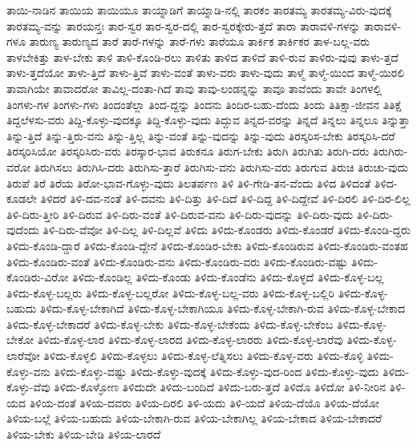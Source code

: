 {ತಾಯಿ-ನಾಡಿನ
ತಾಯಿಯ
ತಾಯಿಯೂ
ತಾಯ್ನಾಡಿಗೆ
ತಾಯ್ನಾಡಿ-ನಲ್ಲಿ
ತಾರಕಂ
ತಾರತಮ್ಯ
ತಾರತಮ್ಯ-ವಿರು-ವುದಕ್ಕೆ
ತಾರತಮ್ಯ-ವನ್ನು
ತಾರಯನ್ತಃ
ತಾರ-ಸ್ವರ
ತಾರ-ಸ್ವರ-ದಲ್ಲಿ
ತಾರ-ಸ್ವರಕ್ಕೇರು-ತ್ತದೆ
ತಾರಾ
ತಾರಾವಳಿ-ಗಳನ್ನು
ತಾರಾವಳಿ-ಗಳೂ
ತಾರುಣ್ಯ
ತಾರುಣ್ಯದ
ತಾರೆ
ತಾರೆ-ಗಳನ್ನು
ತಾರೆ-ಗಳು
ತಾರೆಯೂ
ತಾರ್ಕಿಕ
ತಾರ್ಕಿಕರ
ತಾಳ-ಬಲ್ಲ-ವರು
ತಾಳಬೇಕಿತ್ತು
ತಾಳ-ಬೇಕು
ತಾಳಿ
ತಾಳಿ-ಕೊಂಡಿ-ರಲು
ತಾಳಿತು
ತಾಳಿದ
ತಾಳಿದೆ
ತಾಳಿ-ರುವ
ತಾಳಿರು-ವುವು
ತಾಳು-ತ್ತದೆ
ತಾಳು-ತ್ತದೆಯೋ
ತಾಳು-ತ್ತಿದೆ
ತಾಳು-ತ್ತಿವೆ
ತಾಳು-ವಂತೆ
ತಾಳು-ವರು
ತಾಳು-ವುದು
ತಾಳ್ಮೆ
ತಾಳ್ಮೆ-ಯಿಂದ
ತಾಳ್ಮೆ-ಯಿರಲಿ
ತಾವಾಗಿಯೇ
ತಾವಾದರೋ
ತಾವಿಲ್ಲ-ದಂತಾ-ಗಿದೆ
ತಾವು
ತಾವು-ಲಂಡನ್ನನ್ನು
ತಾವೂ
ತಾವೆಂದು
ತಾವೇ
ತಿಂಗಳಲ್ಲಿ
ತಿಂಗಳು-ಗಳ
ತಿಂಗಳು-ಗಳು
ತಿಂದಂತೆಲ್ಲಾ
ತಿಂದ-ದ್ದನ್ನು
ತಿಂದನು
ತಿಂದಿರ-ಬಹು-ದೆಂದು
ತಿಂದು
ತಿತಿಕ್ಷಾ-ಜೀವನ
ತಿತಿಕ್ಷೆ
ತಿದ್ದಲೆಳಸು-ವರು
ತಿದ್ದಿ-ಕೊಳ್ಳು-ವುದಕ್ಕೂ
ತಿದ್ದಿ-ಕೊಳ್ಳು-ವುದು
ತಿದ್ದುವ
ತಿನ್ನದ-ವರನ್ನು
ತಿನ್ನದೆ
ತಿನ್ನಲು
ತಿನ್ನಲೂ
ತಿನ್ನುತ್ತಾ
ತಿನ್ನು-ತ್ತಿದೆ
ತಿನ್ನು-ತ್ತಿರು-ವನು
ತಿನ್ನು-ತ್ತಿಲ್ಲ
ತಿನ್ನು-ವಂತೆ
ತಿನ್ನು-ವುದನ್ನು
ತಿನ್ನು-ವುದು
ತಿರಸ್ಕರಿಸ-ಬೇಕು
ತಿರಸ್ಕರಿಸಿ-ದರೆ
ತಿರಸ್ಕರಿಸಿಯೋ
ತಿರಸ್ಕರಿಸಿರು-ವರು
ತಿರಸ್ಕಾರ-ಭಾವ
ತಿರುಕನೂ
ತಿರುಗ-ಬೇಕು
ತಿರುಗಿ
ತಿರುಗಿತು
ತಿರುಗಿ-ದರು
ತಿರುಗಿರು-ವರೋ
ತಿರುಗಿಸಲು
ತಿರುಗಿಸಿ-ದರು
ತಿರುಗಿಸು-ತ್ತಾರೆ
ತಿರುಗಿಸು-ವನು
ತಿರುಗಿಸು-ವರು
ತಿರುಗುವ
ತಿರುಚಿ
ತಿರುಚು-ವುದು
ತಿರುಪೆ
ತಿರೆ
ತಿರೆಯ
ತಿರೋ-ಭಾವ-ಗೊಳ್ಳು-ವುದು
ತಿಲತರ್ಪಣ
ತಿಳಿ
ತಿಳಿ-ಗೇಡಿ-ತನ-ವೆಂದು
ತಿಳಿದ
ತಿಳಿದಂತೆ
ತಿಳಿದ-ಕೂಡಲೇ
ತಿಳಿದರೆ
ತಿಳಿ-ದವ-ನಂತೆ
ತಿಳಿ-ದವನು
ತಿಳಿ-ದಿತ್ತು
ತಿಳಿ-ದಿದೆ
ತಿಳಿ-ದಿದ್ದ
ತಿಳಿ-ದಿದ್ದೇವೆ
ತಿಳಿ-ದಿರಲಿ
ತಿಳಿ-ದಿರ-ಲಿಲ್ಲ
ತಿಳಿ-ದಿರು-ತ್ತೀರಿ
ತಿಳಿ-ದಿರುವ
ತಿಳಿ-ದಿರು-ವಂತೆ
ತಿಳಿ-ದಿರುವ-ವನು
ತಿಳಿ-ದಿರು-ವುದನ್ನು
ತಿಳಿ-ದಿರು-ವುದು
ತಿಳಿ-ದಿರು-ವುದೆಂದು
ತಿಳಿ-ದಿರು-ವೆವೋ
ತಿಳಿ-ದಿಲ್ಲ
ತಿಳಿ-ದಿಲ್ಲವೆ
ತಿಳಿದು
ತಿಳಿದು-ಕೊಂಡರು
ತಿಳಿದು-ಕೊಂಡರೆ
ತಿಳಿದು-ಕೊಂಡಿ-ದ್ದರು
ತಿಳಿದು-ಕೊಂಡಿ-ದ್ದಾರೆ
ತಿಳಿದು-ಕೊಂಡಿ-ದ್ದೇನೆ
ತಿಳಿದು-ಕೊಂಡಿರ-ಬೇಕು
ತಿಳಿದು-ಕೊಂಡಿರುವ
ತಿಳಿದು-ಕೊಂಡಿರು-ವಂತಹ
ತಿಳಿದು-ಕೊಂಡಿರು-ವಂತೆ
ತಿಳಿದು-ಕೊಂಡಿರು-ವನು
ತಿಳಿದು-ಕೊಂಡಿರು-ವರು
ತಿಳಿದು-ಕೊಂಡಿರು-ವಷ್ಟು
ತಿಳಿದು-ಕೊಂಡಿರು-ವಿರೋ
ತಿಳಿದು-ಕೊಂಡಿಲ್ಲ
ತಿಳಿದು-ಕೊಂಡು
ತಿಳಿದು-ಕೊಂಡೆನು
ತಿಳಿದು-ಕೊಳ್ಳದೆ
ತಿಳಿದು-ಕೊಳ್ಳ-ಬಲ್ಲ
ತಿಳಿದು-ಕೊಳ್ಳ-ಬಲ್ಲರು
ತಿಳಿದು-ಕೊಳ್ಳ-ಬಲ್ಲರೋ
ತಿಳಿದು-ಕೊಳ್ಳ-ಬಲ್ಲ-ವರು
ತಿಳಿದು-ಕೊಳ್ಳ-ಬಲ್ಲಿರಿ
ತಿಳಿದು-ಕೊಳ್ಳ-ಬಹುದು
ತಿಳಿದು-ಕೊಳ್ಳ-ಬೇಕಾಗಿದೆ
ತಿಳಿದು-ಕೊಳ್ಳ-ಬೇಕಾಗಿಯೂ
ತಿಳಿದು-ಕೊಳ್ಳ-ಬೇಕಾಗಿ-ರುವ
ತಿಳಿದು-ಕೊಳ್ಳ-ಬೇಕಾದ
ತಿಳಿದು-ಕೊಳ್ಳ-ಬೇಕಾದರೆ
ತಿಳಿದು-ಕೊಳ್ಳ-ಬೇಕು
ತಿಳಿದು-ಕೊಳ್ಳ-ಬೇಕೆಂದು
ತಿಳಿದು-ಕೊಳ್ಳ-ಬೇಕೆಂಬ
ತಿಳಿದು-ಕೊಳ್ಳ-ಬೇಕೋ
ತಿಳಿದು-ಕೊಳ್ಳ-ಲಾರ
ತಿಳಿದು-ಕೊಳ್ಳ-ಲಾರದ
ತಿಳಿದು-ಕೊಳ್ಳ-ಲಾರರು
ತಿಳಿದು-ಕೊಳ್ಳ-ಲಾರೆವು
ತಿಳಿದು-ಕೊಳ್ಳ-ಲಾರೆವೋ
ತಿಳಿದು-ಕೊಳ್ಳಲಿ
ತಿಳಿದು-ಕೊಳ್ಳಲು
ತಿಳಿದು-ಕೊಳ್ಳ-ಲೆತ್ನಿಸಲು
ತಿಳಿದು-ಕೊಳ್ಳ-ವರು
ತಿಳಿದು-ಕೊಳ್ಳಿ
ತಿಳಿದು-ಕೊಳ್ಳು-ವನು
ತಿಳಿದು-ಕೊಳ್ಳು-ವಷ್ಟು
ತಿಳಿದು-ಕೊಳ್ಳು-ವುದಕ್ಕೆ
ತಿಳಿದು-ಕೊಳ್ಳು-ವುದ-ರಿಂದ
ತಿಳಿದು-ಕೊಳ್ಳು-ವುದು
ತಿಳಿದು-ಕೊಳ್ಳು-ವೆವು
ತಿಳಿದು-ಕೊಳ್ಳೋಣ
ತಿಳಿದುದೇ
ತಿಳಿದು-ಬಂದಿದೆ
ತಿಳಿದು-ಬರು-ತ್ತದೆ
ತಿಳಿದೊ
ತಿಳಿದೋ
ತಿಳಿ-ನೀರಿನ
ತಿಳಿ-ಯದ
ತಿಳಿಯ-ದಂತೆ
ತಿಳಿಯ-ದವರು
ತಿಳಿಯ-ದಿರಲಿ
ತಿಳಿ-ಯದು
ತಿಳಿ-ಯದೆ
ತಿಳಿಯ-ದೆಯೊ
ತಿಳಿಯ-ದೆಯೋ
ತಿಳಿಯ-ಬಲ್ಲೆ
ತಿಳಿಯ-ಬಹುದು
ತಿಳಿಯ-ಬೇಕಾಗಿ-ರುವ
ತಿಳಿಯ-ಬೇಕಾಗಿಲ್ಲ
ತಿಳಿಯ-ಬೇಕಾದ
ತಿಳಿಯ-ಬೇಕಾದರೆ
ತಿಳಿಯ-ಬೇಕು
ತಿಳಿಯ-ಬೇಡಿ
ತಿಳಿಯ-ಲಾರದೆ
}
